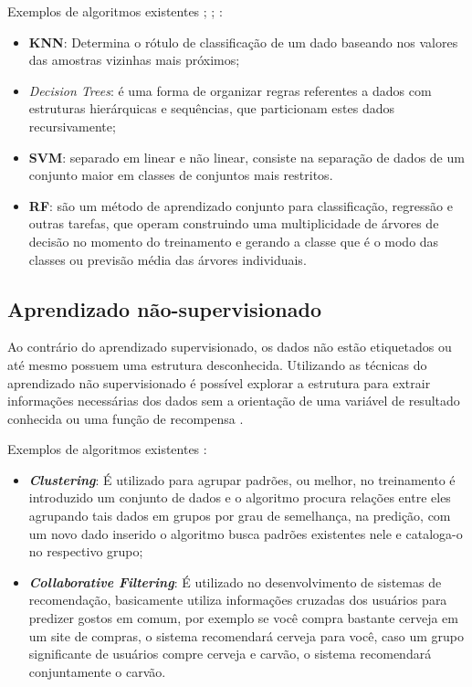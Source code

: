 Exemplos de algoritmos existentes \cite{lorena2007introduccao}; \cite{kirk2014thoughtful}; \cite{murthy1998automatic} \cite{ho1995random}:

\begin{itemize}
    \item \textbf{KNN}: Determina o rótulo de classificação de um dado baseando nos valores das amostras vizinhas mais próximos;
    \item \textit{Decision Trees}: é uma forma de organizar regras referentes a dados com estruturas hierárquicas e sequências, que particionam estes dados recursivamente;
    \item \textbf{SVM}: separado em linear e não linear, consiste na separação de dados de um conjunto maior em classes de conjuntos mais restritos.
    \item \textbf{RF}: são um método de aprendizado conjunto para classificação, regressão e outras tarefas, que operam construindo uma multiplicidade de árvores de decisão no momento do treinamento e gerando a classe que é o modo das classes ou previsão média das árvores individuais.
\end{itemize}

\subsection{Aprendizado não-supervisionado}
Ao contrário do aprendizado supervisionado, os dados não estão etiquetados ou até mesmo possuem uma estrutura desconhecida. Utilizando as técnicas do aprendizado não supervisionado é possível explorar a estrutura para extrair informações necessárias dos dados sem a orientação de uma variável de resultado conhecida ou uma função de recompensa \cite{geron2017hands}.

Exemplos de algoritmos existentes \cite{kirk2014thoughtful}:
\begin{itemize}
    \item  \textbf{\textit{Clustering}}: É utilizado para agrupar padrões, ou melhor, no treinamento é introduzido um conjunto de dados e o algoritmo procura relações entre eles agrupando tais dados em grupos por grau de semelhança, na predição, com um novo dado inserido o algoritmo busca padrões existentes nele e cataloga-o no respectivo grupo;   
    \item  \textbf{\textit{Collaborative Filtering}}: É utilizado no desenvolvimento de sistemas de recomendação, basicamente utiliza informações cruzadas dos usuários para predizer gostos em comum, por exemplo se você compra bastante cerveja em um site de compras, o sistema recomendará cerveja para você, caso um grupo significante de usuários compre cerveja e carvão, o sistema recomendará conjuntamente o carvão.
\end{itemize}

